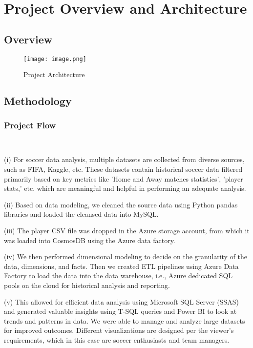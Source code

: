\documentclass[lettersize]{IEEEtran}
\begin{document}
\section{\textbf{Project Overview and Architecture}}
\subsection{\textbf{Overview}}
\vspace{-\baselineskip}
\begin{minipage}{0.5\textwidth}
\begin{figure}[H]
    \texttt{[image: image.png]}
    \caption{Project Architecture}
    \label{fig:image_label}
\end{figure}
\end{minipage}

\subsection{\textbf{Methodology}}
\subsubsection{\textbf{Project Flow}}\

(i) For soccer data analysis, multiple datasets are collected from diverse sources, such as FIFA, Kaggle, etc. These datasets contain historical soccer data filtered primarily based on key metrics like 'Home and Away matches statistics', ’player stats,’ etc. which are meaningful and helpful in performing an adequate analysis. 

(ii) Based on data modeling, we cleaned the source data using Python pandas libraries and loaded the cleansed data into MySQL.

(iii) The player CSV file was dropped in the Azure storage account, from which it was loaded into CosmosDB using the Azure data factory.

(iv) We then performed dimensional modeling to decide on the granularity of the data, dimensions, and facts. Then we created ETL pipelines using Azure Data Factory to load the data into the data warehouse, i.e., Azure dedicated SQL pools on the cloud for historical analysis and reporting. 

(v) This allowed for efficient data analysis using Microsoft SQL Server (SSAS) and generated valuable insights using T-SQL queries and Power BI to look at trends and patterns in data. We were able to manage and analyze large datasets for improved outcomes. Different visualizations are designed per the viewer's requirements, which in this case are soccer enthusiasts and team managers.
\end{document}
